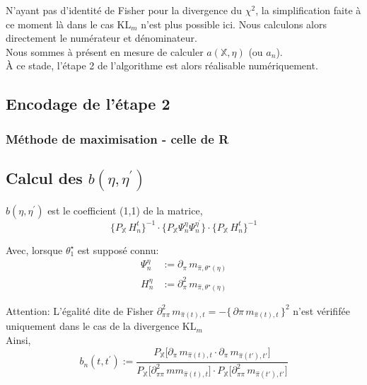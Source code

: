 \documentclass{article}
\begin{document}
    {\color{red}N'ayant pas d'identité de Fisher pour la divergence du $\chi^2$}, la simplification faite à ce moment là dans le cas KL$_m$ n'est plus possible ici. Nous calculons alors directement le numérateur et dénominateur. \\

    Nous sommes à présent en mesure de calculer $a(\mathbb{X},\eta)$ (ou $a_n$). \\

    {\color{red}À ce stade, l'étape 2 de l'algorithme est alors réalisable numériquement.}

    \subsection{Encodage de l'étape 2}
    \subsubsection{Méthode de maximisation - celle de R}
    

    \subsection{Calcul des $b(\eta,\eta^\prime)$}

    $b(\eta,\eta^\prime)$ est le coefficient (1,1) de la matrice,
    $$ \{P_\mathbb{X}\,H_n^t\}^{-1}\cdot\{P_\mathbb{X}\Psi^\eta_n{}\Psi^{\eta^\prime}_n\}\cdot\{P_\mathbb{X}\,H_n^t\}^{-1}$$

    Avec, lorsque $\theta_1^\star$ est supposé connu:
    \begin{align*}
        \Psi^\eta_n &:= \partial_\pi\,m_{\hat\pi,\theta^\star(\eta)} \\
        H^\eta_n &:= \partial^2_\pi\,m_{\hat\pi,\theta^\star(\eta)}
    \end{align*}

    {\color{red} Attention: L'égalité dite de Fisher $\partial^2_{\pi\pi}\,m_{\hat\pi(t),t} = -\{\,\partial\pi\,m_{\hat\pi(t),t}\,\}^2$ n'est vérififée uniquement dans le cas de la divergence KL$_m$} \\

    Ainsi,   $$b_n(t,t^\prime) := \dfrac{ P_\mathbb{X}\Big[ \partial_\pi\,m_{\hat\pi(t),t} \cdot \partial_\pi\,m_{\hat\pi(t'),t'}\Big]}{P_\mathbb{X}\Big[ \partial^2_{\pi\pi}\,mm_{\hat\pi(t),t}\Big] \cdot P_\mathbb{X}\Big[ \partial^2_{\pi\pi}\,m_{\hat\pi(t'),t'}\Big]}$$
\end{document}

